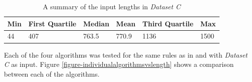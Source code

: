 \documentclass[11pt]{article}
\begin{document}
\begin{table}[!htb]
\centering
\begin{tabular}{@{}llllll@{}}
\toprule
Min & First Quartile & Median & Mean & Third Quartile & Max \\ \midrule
44 & 407 & 763.5 & 770.9 & 1136 & 1500 \\ \bottomrule
\end{tabular}
\caption{A summary of the input lengths in \textit{Dataset C}}
\label{table-datasetcinputlengthsummary}
\end{table}

Each of the four algorithms was tested for the same rules as in \citet{hunt2016} and with \textit{Dataset C} as input. Figure \ref{figure-individualalgorithmsvslength} shows a comparison between each of the algorithms.
\end{document}
